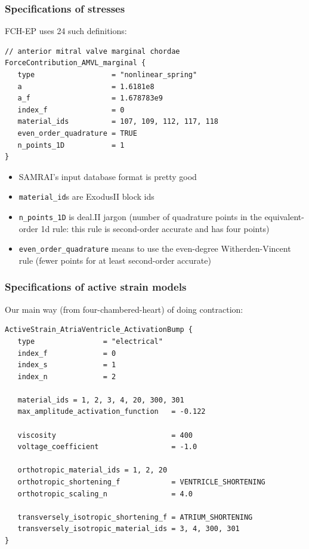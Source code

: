 \documentclass[8pt]{beamer}
\begin{document}
\begin{frame}[fragile]
  \frametitle{Specifications of stresses}
  FCH-EP uses 24 such definitions:
  \lstset{language=c}
  \begin{lstlisting}
// anterior mitral valve marginal chordae
ForceContribution_AMVL_marginal {
   type                  = "nonlinear_spring"
   a                     = 1.6181e8
   a_f                   = 1.678783e9
   index_f               = 0
   material_ids          = 107, 109, 112, 117, 118
   even_order_quadrature = TRUE
   n_points_1D           = 1
}
  \end{lstlisting}
  \begin{itemize}
    \item[$\blacksquare$] SAMRAI's input database format is pretty good
    \item[$\blacksquare$] \texttt{material\_id}s are ExodusII block ids
    \item[$\blacksquare$] \texttt{n\_points\_1D} is deal.II jargon (number of quadrature points
      in the equivalent-order 1d rule: this rule is second-order accurate and
      has four points)
    \item[$\blacksquare$] \texttt{even\_order\_quadrature} means to use the even-degree
      Witherden-Vincent rule (fewer points for at least second-order accurate)
  \end{itemize}
  \end{frame}

\begin{frame}[fragile]
  \frametitle{Specifications of active strain models}
  Our main way (from four-chambered-heart) of doing contraction:
  \begin{lstlisting}
ActiveStrain_AtriaVentricle_ActivationBump {
   type                = "electrical"
   index_f             = 0
   index_s             = 1
   index_n             = 2

   material_ids = 1, 2, 3, 4, 20, 300, 301
   max_amplitude_activation_function   = -0.122

   viscosity                           = 400
   voltage_coefficient                 = -1.0

   orthotropic_material_ids = 1, 2, 20
   orthotropic_shortening_f            = VENTRICLE_SHORTENING
   orthotropic_scaling_n               = 4.0

   transversely_isotropic_shortening_f = ATRIUM_SHORTENING
   transversely_isotropic_material_ids = 3, 4, 300, 301
}
  \end{lstlisting}
\end{frame}
\end{document}
